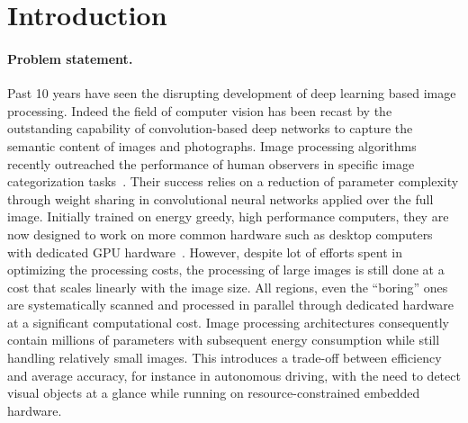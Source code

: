 \section{Introduction}
\label{sec:intro}
\paragraph{Problem statement.}


Past 10 years have seen the disrupting development of deep learning based image processing. 
Indeed the field of computer vision has been recast by the outstanding capability of convolution-based deep networks to capture the semantic content of images and photographs. Image processing algorithms recently outreached the performance of human observers in specific image categorization tasks~\citep{He15}. Their success relies on a reduction of parameter complexity through weight sharing  in convolutional neural networks applied over the full image. 
Initially trained on energy greedy, high performance computers, they are now designed to work on more common hardware such as desktop computers with dedicated GPU hardware~\citep{Sandler18}.
However, despite lot of efforts spent in optimizing the processing costs, the processing of large images is still done at a cost that scales linearly with the image size. All regions, even the “boring” ones are systematically scanned and processed in parallel through dedicated hardware at a significant computational cost.
Image processing architectures consequently contain millions of parameters with subsequent energy consumption while still handling relatively small images. This introduces a trade-off between efficiency and average accuracy, for instance in autonomous driving, with the need to detect visual objects at a glance while running on resource-constrained embedded hardware. 

